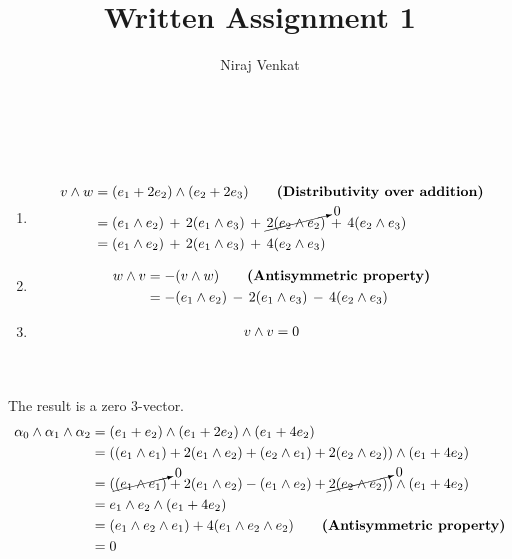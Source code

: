 \documentclass{article}
\begin{document}
\title{Written Assignment 1}

\author{Niraj Venkat}

\date{}

\maketitle

\vspace{.8cm}
\\\\

\begin{enumerate}[label=(\alph*)]
    \item
    \begin{align}
        v \wedge w  &= (e_1 + 2e_2) \wedge (e_2 + 2e_3) \tag*{\bfseries(Distributivity over addition)}\\
                    &= (e_1 \wedge e_2) \, + \,  2(e_1 \wedge e_3) \, + \, \cancelto{0}{2(e_2 \wedge e_2)} \, + \, 4(e_2 \wedge e_3) \notag\\
                    &= (e_1 \wedge e_2) \, + \,  2(e_1 \wedge e_3) \, + \, 4(e_2 \wedge e_3) \notag
    \end{align}

    \item 
    \begin{align}
        w \wedge v  &= -(v \wedge w) \tag*{\bfseries(Antisymmetric property)}\\
                    &= -(e_1 \wedge e_2) \, - \,  2(e_1 \wedge e_3) \, - \, 4(e_2 \wedge e_3) \notag
    \end{align}
    \item 
    \begin{align}
        v \wedge v  = 0 \notag
    \end{align}
\end{enumerate}



\vspace{1.8cm}
\\\\

The result is a zero 3-vector.
\begin{align}
    \alpha_0 \wedge \alpha_1 \wedge \alpha_2 &= (e_1 + e_2) \wedge (e_1 + 2e_2) \wedge (e_1 + 4e_2) \notag\\
        &= ((e_1 \wedge e_1) + 2(e_1 \wedge e_2) + (e_2 \wedge e_1) + 2(e_2 \wedge e_2)) \wedge (e_1 + 4e_2) \notag\\    
        &= (\cancelto{0}{(e_1 \wedge e_1)} + 2(e_1 \wedge e_2) - (e_1 \wedge e_2) + \cancelto{0}{2(e_2 \wedge e_2)}) \wedge (e_1 + 4e_2) \notag\\
        &= e_1 \wedge e_2 \wedge (e_1 + 4e_2) \notag\\
        &= (e_1 \wedge e_2 \wedge e_1) + 4(e_1 \wedge e_2 \wedge e_2) \tag*{\bfseries(Antisymmetric property)}\\
        &= 0 \notag
\end{align}
\end{document}
